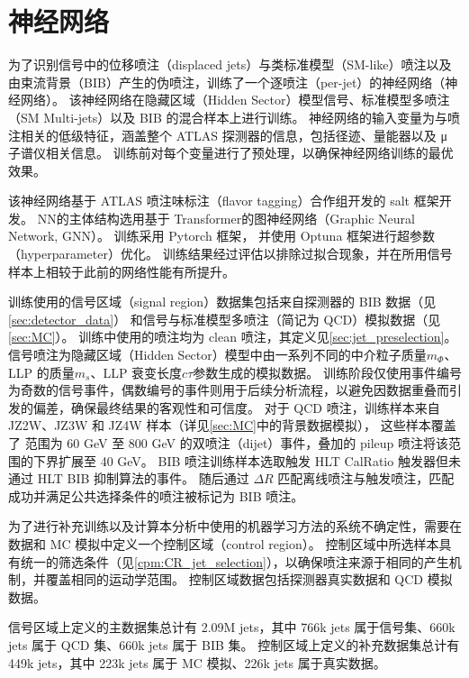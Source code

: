 
\chapter{神经网络}
\label{chap:NN}

为了识别信号中的位移喷注（displaced jets）与类标准模型（SM-like）喷注以及由束流背景（BIB）产生的伪喷注，训练了一个逐喷注（per-jet）的神经网络（神经网络）。
该神经网络在隐藏区域（Hidden Sector）模型信号、标准模型多喷注（SM Multi-jets）以及 BIB 的混合样本上进行训练。
神经网络的输入变量为与喷注相关的低级特征，涵盖整个 ATLAS 探测器的信息，包括径迹、量能器以及 μ 子谱仪相关信息。
训练前对每个变量进行了预处理，以确保神经网络训练的最优效果。

该神经网络基于 ATLAS 喷注味标注（flavor tagging）合作组开发的 salt 框架\cite{ATL-PHYS-PUB-2022-027}开发。
NN的主体结构选用基于 Transformer\cite{vaswani2023attentionneed}的图神经网络（Graphic Neural Network, GNN）。
训练采用 Pytorch 框架\cite{paszke2019pytorchimperativestylehighperformance}，
并使用 Optuna 框架\cite{akiba2019optunanextgenerationhyperparameteroptimization}进行超参数（hyperparameter）优化。
训练结果经过评估以排除过拟合现象，并在所用信号样本上相较于此前的网络性能有所提升。

训练使用的信号区域（signal region）数据集包括来自探测器的 BIB 数据（见\autoref{sec:detector_data}）
和信号与标准模型多喷注（简记为 QCD）模拟数据（见\autoref{sec:MC}）。
训练中使用的喷注均为 clean 喷注，其定义见\autoref{sec:jet_preselection}。
信号喷注为隐藏区域（Hidden Sector）模型中由一系列不同的中介粒子质量$m_\Phi$、LLP 的质量$m_s$、LLP 衰变长度$c\tau$参数生成的模拟数据。
训练阶段仅使用事件编号为奇数的信号事件，偶数编号的事件则用于后续分析流程，以避免因数据重叠而引发的偏差，确保最终结果的客观性和可信度。
对于 QCD 喷注，训练样本来自 JZ2W、JZ3W 和 JZ4W 样本（详见\autoref{sec:MC}中的背景数据模拟），
这些样本覆盖了 \pt 范围为 60 GeV 至 800 GeV 的双喷注（dijet）事件，叠加的 pileup 喷注将该范围的下界扩展至 40 GeV。
BIB 喷注训练样本选取触发 HLT CalRatio 触发器但未通过 HLT BIB 抑制算法的事件。
随后通过 $\Delta R$ 匹配离线喷注与触发喷注，匹配成功并满足公共选择条件的喷注被标记为 BIB 喷注。

为了进行补充训练以及计算本分析中使用的机器学习方法的系统不确定性，需要在数据和 MC 模拟中定义一个控制区域（control region）。
控制区域中所选样本具有统一的筛选条件（见\autoref{cpm:CR_jet_selection}），以确保喷注来源于相同的产生机制，并覆盖相同的运动学范围。
控制区域数据包括探测器真实数据和 QCD 模拟数据。

信号区域上定义的主数据集总计有 2.09M jets，其中 766k jets 属于信号集、660k jets 属于 QCD 集、660k jets 属于 BIB 集。
控制区域上定义的补充数据集总计有 449k jets，其中 223k jets 属于 MC 模拟、226k jets 属于真实数据。

